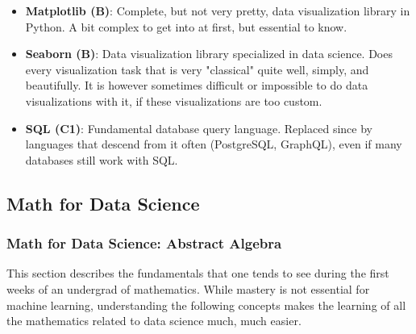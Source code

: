 \documentclass{article}
\begin{document}
\begin{itemize}
    \item \textbf{Matplotlib (B)}: Complete, but not very pretty, data visualization library in Python. A bit complex to get into at first, but essential to know.
    
    \item \textbf{Seaborn (B)}: Data visualization library specialized in data science. Does every visualization task that is very "classical" quite well, simply, and beautifully. It is however sometimes difficult or impossible to do data visualizations with it, if these visualizations are too custom.
    
    \item \textbf{SQL (C1)}: Fundamental database query language. Replaced since by languages that descend from it often (PostgreSQL, GraphQL), even if many databases still work with SQL.
\end{itemize}



\subsection*{Math for Data Science}

\subsubsection*{Math for Data Science: Abstract Algebra}

This section describes the fundamentals that one tends to see during the first weeks of an undergrad of mathematics. While mastery is not essential for machine learning, understanding the following concepts makes the learning of all the mathematics related to data science much, much easier.
\end{document}
